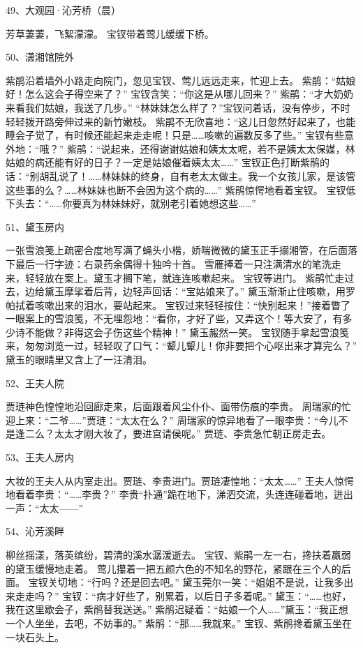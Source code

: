 49、大观园·沁芳桥（晨）\par 
芳草萋萋，飞絮濛濛。 宝钗带着莺儿缓缓下桥。 

50、潇湘馆院外\par 
紫鹃沿着墙外小路走向院门，忽见宝钗、莺儿远远走来，忙迎上去。 
紫鹃：“姑娘好！怎么这会子得空来了？” 宝钗含笑：“你这是从哪儿回来？” 
紫鹃：“才大奶奶来看我们姑娘，我送了几步。” 
“林妹妹怎么样了？”宝钗问着话，没有停步，不时轻轻拨开路旁伸过来的新竹嫩枝。 
紫鹃不无欣喜地：“这儿日忽然好起来了，也能睡会子觉了，有时候还能起来走走呢！只是……咳嗽的遍数反多了些。” 
宝钗有些意外地：“哦？” 紫鹃：“说起来，还得谢谢姑娘和姨太太呢，若不是姨太太保媒，林姑娘的病还能有好的日子？一定是姑娘催着姨太太……” 
宝钗正色打断紫鹃的话：“别胡乱说了！……林妹妹的终身，自有老太太做主。我一个女孩儿家，是该管这些事的么？……林妹妹也断不会因为这个病的……” 
紫鹃惊愕地看着宝钗。 宝钗低下头去：“……你要真为林妹妹好，就别老引着她想这些……” 

51、黛玉房内 \par
一张雪浪笺上疏密合度地写满了蝇头小楷，娇喘微微的黛玉正手搦湘管，在后面落下最后一行字迹：右录药余偶得十独吟十首。 
雪雁捧着一只注满清水的笔洗走来，轻轻放在案上。黛玉才搁下笔，就连连咳嗽起来。 
宝钗等进门。 紫鹃忙走过去，边给黛玉摩挲着后背，边轻声回话：“宝姑娘来了。” 
黛玉渐渐止住咳嗽，用罗帕拭着咳嗽出来的泪水，要站起来。 
宝钗过来轻轻按住：“快别起来！”接着瞥了一眼案上的雪浪笺，不无埋怨地：“看你，才好了些，又弄这个！等大安了，有多少诗不能做？非得这会子伤这些个精神！” 
黛玉赧然一笑。 宝钗随手拿起雪浪笺来，匆匆浏览一过，轻轻叹了口气：“颦儿颦儿！你非要把个心呕出来才算完么？” 
黛玉的眼睛里又含上了一汪清泪。 

52、王夫人院\par
贾琏神色惶惶地沿回廊走来，后面跟着风尘仆仆、面带伤痕的李贵。 
周瑞家的忙迎上来：“二爷……”贾琏：“太太在么？” 
周瑞家的惊异地看了一眼李贵：“今儿不是逢二么？太太才刚大妆了，要进宫请侯呢。” 
贾琏、李贵急忙朝正房走去。 

53、王夫人房内 \par
大妆的王夫人从内室走出。贾琏、李贵进门。贾琏凄惶地：“太太……” 
王夫人惊愕地看着李贵：“……李贵？” 
李贵“扑通”跪在地下，涕泗交流，头连连碰着地，迸出一声：“太太——” 

54、沁芳溪畔\par 
柳丝摇漾，落英缤纷，碧清的溪水潺湲逝去。 
宝钗、紫鹃一左一右，搀扶着羸弱的黛玉缓慢地走着。 
莺儿攥着一把五颜六色的不知名的野花，紧跟在三个人的后面。 
宝钗关切地：“行吗？还是回去吧。” 
黛玉莞尔一笑：“姐姐不是说，让我多出来走走吗？” 
宝钗：“病才好些了，别累着，以后日子多着呢。” 
黛玉：“……也好，我在这里歇会子，紫鹃替我送送。” 
紫鹃迟疑着：“姑娘一个人……”黛玉：“我正想一个人坐坐，去吧，不妨事的。” 
紫鹃：“那……我就来。” 宝钗、紫鹃搀着黛玉坐在一块石头上。 

